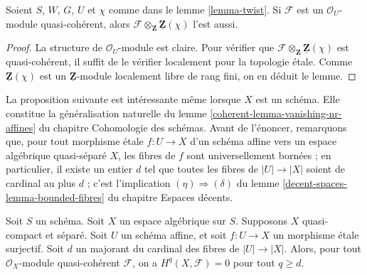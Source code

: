 \begin{lemma}
\label{lemma-quasi-coherent-twist}
Soient $S$, $W$, $G$, $U$ et $\chi$ comme dans le
lemme \ref{lemma-twist}.
Si $\mathcal{F}$ est un $\mathcal{O}_U$-module quasi-cohérent,
alors $\mathcal{F} \otimes_{\mathbf{Z}} \underline{\mathbf{Z}}(\chi)$ l'est aussi.
\end{lemma}

\begin{proof}
La structure de $\mathcal{O}_U$-module est claire. Pour vérifier que
$\mathcal{F} \otimes_{\mathbf{Z}} \underline{\mathbf{Z}}(\chi)$
est quasi-cohérent, il suffit de le vérifier localement pour la topologie \'etale.
Comme $\underline{\mathbf{Z}}(\chi)$
est un $\underline{\mathbf{Z}}$-module localement libre de rang fini, on en déduit le lemme.
\end{proof}

\noindent
La proposition suivante est intéressante même lorsque $X$ est un schéma.
Elle constitue la généralisation naturelle du
lemme \ref{coherent-lemma-vanishing-nr-affines} du chapitre Cohomologie des schémas.
Avant de l'énoncer, remarquons que, pour tout morphisme \'etale
$f : U \to X$ d'un schéma affine vers un espace algébrique
quasi-séparé $X$, les fibres de $f$ sont universellement bornées ; en particulier,
il existe un entier $d$ tel que toutes les fibres de $|U| \to |X|$
soient de cardinal au plus $d$ ; c'est l'implication
$(\eta) \Rightarrow (\delta)$ du lemme
\ref{decent-spaces-lemma-bounded-fibres} du chapitre Espaces décents.

\begin{proposition}
\label{proposition-vanishing}
Soit $S$ un schéma. Soit $X$ un espace algébrique sur $S$.
Supposons $X$ quasi-compact et séparé.
Soit $U$ un schéma affine, et soit
$f : U \to X$ un morphisme \'etale surjectif.
Soit $d$ un majorant du cardinal des fibres de
$|U| \to |X|$. Alors, pour tout $\mathcal{O}_X$-module quasi-cohérent $\mathcal{F}$,
on a $H^q(X, \mathcal{F}) = 0$ pour tout $q \geq d$.
\end{proposition}

